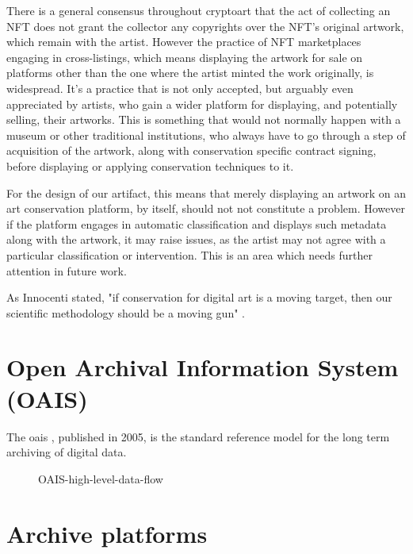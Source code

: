 There is a general consensus throughout cryptoart that the act of collecting an NFT does not grant the collector any copyrights over the NFT's original artwork, which remain with the artist. However the practice of NFT marketplaces engaging in cross-listings, which means displaying the artwork for sale on platforms other than the one where the artist minted the work originally, is widespread. It's a practice that is not only accepted, but arguably even appreciated by artists, who gain a wider platform for displaying, and potentially selling, their artworks. This is something that would not normally happen with a museum or other traditional institutions, who always have to go through a step of acquisition of the artwork, along with conservation specific contract signing, before displaying or applying conservation techniques to it.

For the design of our artifact, this means that merely displaying an artwork on an art conservation platform, by itself, should not not constitute a problem. However if the platform engages in automatic classification and displays such metadata along with the artwork, it may raise issues, as the artist may not agree with a particular classification or intervention. This is an area which needs further attention in future work.


As Innocenti stated, "if conservation for digital art is a moving target, then our scientific methodology should be a moving gun" \citeyear[p.230]{innocentiKeepingBitsAlive2013}.




\section{Open Archival Information System (OAIS)}
\label{sub:oais}

\todo

The \gls{oais} , published in 2005, is the standard reference model for the long term archiving of digital data.


\begin{figure}[h]
    \centering
    
    \caption[OAIS-high-level-data-flow]{OAIS-high-level-data-flow}
    \label{fig:oais-high-level-data}
\end{figure}




\section{Archive platforms}

